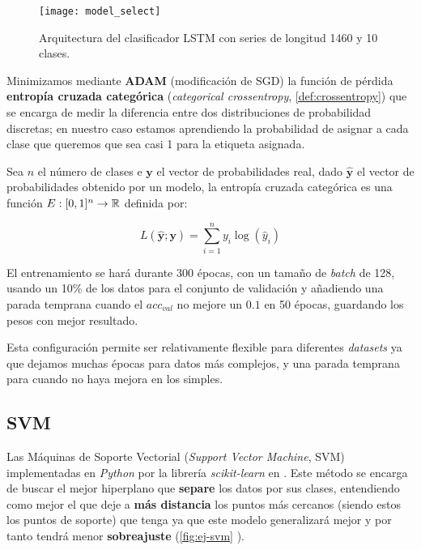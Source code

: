 \begin{figure}[htbp]
  \centering
  \texttt{[image: model\_select]}
  \caption{Arquitectura del clasificador LSTM con series de longitud 1460 y 10 clases.}
  \label{fig:model-select}
\end{figure}

Minimizamos mediante \textbf{ADAM} (modificación de SGD) la función de pérdida \textbf{entropía cruzada categórica} (\emph{categorical crossentropy}, \autoref{def:crossentropy}) que se encarga de medir la diferencia entre dos distribuciones de probabilidad discretas; en nuestro caso estamos aprendiendo la probabilidad de asignar a cada clase que queremos que sea casi 1 para la etiqueta asignada.

\begin{definicion}
  Sea $n$ el número de clases e $\textbf{y}$ el vector de probabilidades real, dado $\hat{\textbf{y}}$ el vector de probabilidades obtenido por un modelo, la entropía cruzada categórica es una función $E : [0, 1]^n \to \mathbb{R}$ definida por:

  $$ L(\hat{\textbf{y}} ; \textbf{y}) = \sum \limits^n_{i = 1} y_i \log(\hat{y}_i)$$
  \label{def:crossentropy}
\end{definicion}

El entrenamiento se hará durante 300 épocas, con un tamaño de \emph{batch} de 128, usando un 10\% de los datos para el conjunto de validación y añadiendo una parada temprana cuando el $acc_{val}$ no mejore un $0.1$ en 50 épocas, guardando los pesos con mejor resultado.

Esta configuración permite ser relativamente flexible para diferentes \emph{datasets} ya que dejamos muchas épocas para datos más complejos, y una parada temprana para cuando no haya mejora en los simples.

\subsection{SVM}

Las Máquinas de Soporte Vectorial (\emph{Support Vector Machine}, SVM) \cite{cortes1995support} implementadas en \emph{Python} por la librería \emph{scikit-learn} en \cite{scikit2020svm}. Este método se encarga de buscar el mejor hiperplano que \textbf{separe} los datos por sus clases, entendiendo como mejor el que deje a \textbf{más distancia} los puntos más cercanos (siendo estos los puntos de soporte) que tenga ya que este modelo generalizará mejor y por tanto tendrá menor \textbf{sobreajuste} (\autoref{fig:ej-svm} \cite{JavaTpointSVM}).

